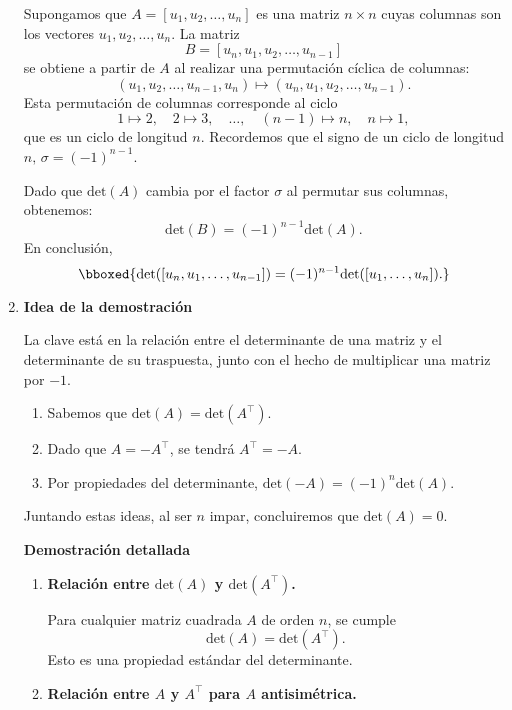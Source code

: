 \begin{enumerate}[label=\color{red}\textbf{\arabic*)}]
    Supongamos que $A=[u_1,u_2,\dots,u_n]$ es una matriz $n\times n$ cuyas columnas son los vectores $u_1,u_2,\dots,u_n$. La matriz \[
        B=[u_n,u_1,u_2,\dots,u_{n-1}]
    \] 
    se obtiene a partir de $A$ al realizar una permutación cíclica de columnas: \[
        (u_1,u_2,\dots,u_{n-1},u_n)\longmapsto (u_n,u_1,u_2,\dots,u_{n-1}).
    \]
    Esta permutación de columnas corresponde al ciclo \[
    1\mapsto 2,\quad 2\mapsto 3,\quad\dots,\quad(n-1)\mapsto n,\quad n\mapsto 1,
    \] 
    que es un ciclo de longitud $n$. Recordemos que el signo de un ciclo de longitud $n,\, \sigma=(-1)^{n-1}$.
    
    Dado que $\mathrm{det}(A)$ cambia por el factor $\sigma$ al permutar sus columnas, obtenemos: \[
    \mathrm{det}(B)=(-1)^{n-1}\mathrm{det}(A).
    \] 
    En conclusión, \[
        \bboxed{\mathrm{det}([u_n,u_1,\dots,u_{n-1}])=(-1)^{n-1}\mathrm{det}([u_1,\dots,u_n]).}
    \] 
\item {}

    \textbf{Idea de la demostración}

    La clave está en la relación entre el determinante de una matriz y el determinante de su traspuesta, junto con el hecho de multiplicar una matriz por $-1$.
     \begin{enumerate}[label=\arabic*)]
        \item Sabemos que $\mathrm{det}(A)=\mathrm{det}(A^\intercal)$.
        \item Dado que $A=-A^\intercal$, se tendrá $A^\intercal=-A$.
        \item Por propiedades del determinante, $\mathrm{det}(-A)=(-1)^n\mathrm{det}(A)$.
    \end{enumerate}
    Juntando estas ideas, al ser $n$ impar, concluiremos que $\mathrm{det}(A)=0$.

    \textbf{Demostración detallada}

    \begin{enumerate}[label=\arabic*)]
        \item \textbf{Relación entre $\mathrm{det}(A)$ y $\mathrm{det}(A^\intercal)$.}

            Para cualquier matriz cuadrada $A$ de orden  $n$, se cumple \[
            \mathrm{det}(A)=\mathrm{det}(A^\intercal).
            \] 
            Esto es una propiedad estándar del determinante.
        \item \textbf{Relación entre $A$ y $A^\intercal$ para $A$ antisimétrica.}


\end{enumerate}
\end{enumerate}
